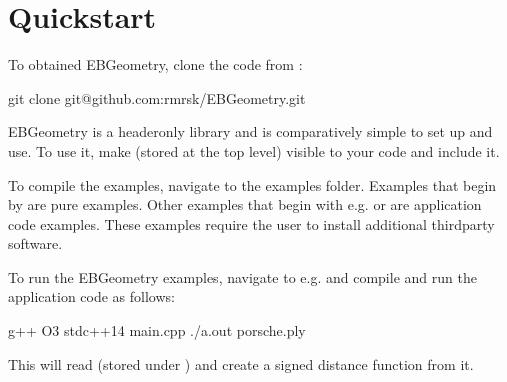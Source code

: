 \documentclass[letterpaper,10pt,english]{sphinxmanual}
\begin{document}
\section{Quickstart}
\label{\detokenize{Introduction:quickstart}}
\sphinxAtStartPar
To obtained EBGeometry, clone the code from :

\begin{sphinxVerbatim}[commandchars=\\\{\}]
git clone git@github.com:rmrsk/EBGeometry.git
\end{sphinxVerbatim}

\sphinxAtStartPar
EBGeometry is a header\sphinxhyphen{}only library and is comparatively simple to set up and use.
To use it, make  (stored at the top level) visible to your code and include it.

\sphinxAtStartPar
To compile the examples, navigate to the examples folder.
Examples that begin by  are pure  examples.
Other examples that begin with e.g.  or  are application code examples.
These examples require the user to install additional third\sphinxhyphen{}party software.

\sphinxAtStartPar
To run the EBGeometry examples, navigate to e.g.  and compile and run the application code as follows:

\begin{sphinxVerbatim}[commandchars=\\\{\}]
g++ \PYGZhy{}O3 \PYGZhy{}stdc++14 main.cpp
./a.out porsche.ply
\end{sphinxVerbatim}

\sphinxAtStartPar
This will read  (stored under ) and create a signed distance function from it.
\end{document}
